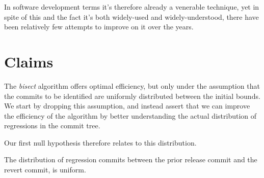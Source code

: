 \documentclass[10pt,journal,compsoc]{IEEEtran}
\begin{document}
In software development terms it's therefore already a venerable technique, yet in spite of this and the fact it's both widely-used and widely-understood, there have been relatively few attempts to improve on it over the years.




\section{Claims}

The {\it bisect\/} algorithm offers optimal efficiency, but only under the assumption that the commits to be identified are uniformly distributed between the initial bounds. We start by dropping this assumption, and instead assert that we can improve the efficiency of the algorithm by better understanding the actual distribution of regressions in the commit tree.

Our first null hypothesis therefore relates to this distribution.

\begin{hypothesis}
\label{hyp:uniform}
The distribution of regression commits between the prior release commit and the revert commit, is uniform.
\end{hypothesis}
\end{document}
